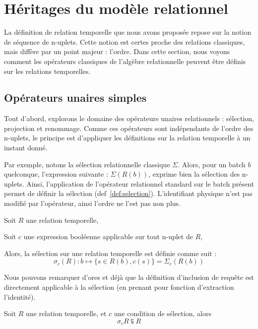 \section{Héritages du modèle relationnel}\label{sec:contrib:astral:relationnel}
La définition de relation temporelle que nous avons proposée repose sur la notion de séquence de n-uplets. Cette notion est certes proche des relations classiques, mais diffère par un point majeur : l'ordre. Dans cette section, nous voyons comment les opérateurs classiques de l'algèbre relationnelle peuvent être définis sur les relations temporelles.

\subsection{Opérateurs unaires simples}
Tout d'abord, explorons le domaine des opérateurs unaires relationnels : sélection, projection et renommage. Comme ces opérateurs sont indépendants de l'ordre des n-uplets, le principe est d'appliquer les définitions sur la relation temporelle à un instant donné.

Par exemple, notons la sélection relationnelle classique $\Sigma$. Alors, pour un batch $b$ quelconque, l'expression suivante : $\Sigma(R(b))$, exprime bien la sélection des n-uplets. Ainsi, l'application de l'opérateur relationnel standard sur le batch présent permet de définir la sélection (def~\ref{def:selection}). L'identifiant physique n'est pas modifié par l'opérateur, ainsi l'ordre ne l'est pas non plus.
\begin{defi}[Sélection]\label{def:selection}
Soit $R$ une relation temporelle,

Soit $c$ une expression booléenne applicable sur tout n-uplet de $R$,

Alors, la sélection sur une relation temporelle est définie comme suit :
$$\sigma_{c}(R) : b \mapsto \{s\in R(b), c(s)\} = \Sigma_c(R(b))$$
\end{defi}

Nous pouvons remarquer d'ores et déjà que la définition d'inclusion de requête est directement applicable à la sélection (en prenant pour fonction d'extraction l'identité).
\begin{prop}\label{prop:inclusionselect}
Soit $R$ une relation temporelle, et $c$ une condition de sélection, alors $$\sigma_c R \subseteqq R$$
\end{prop}

